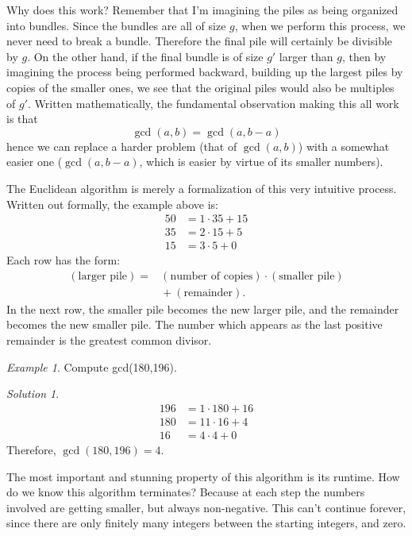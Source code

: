\documentclass{article}
\theoremstyle{plain}
\theoremstyle{definition}
\theoremstyle{remark}
\newtheorem{example}[theorem]{Example}
\newtheorem*{solution}{Solution}
\numberwithin{theorem}{section}
\begin{document}
Why does this work?  Remember that I'm imagining the piles as being organized into bundles.  Since the bundles are all of size $g$, when we perform this process, we never need to break a bundle.  Therefore the final pile will certainly be divisible by $g$.  On the other hand, if the final bundle is of size $g'$ larger than $g$, then by imagining the process being performed backward, building up the largest piles by copies of the smaller ones, we see that the original piles would also be multiples of $g'$.  Written mathematically, the fundamental observation making this all work is that
\[
	\gcd(a,b) = \gcd(a, b-a)
\]
hence we can replace a harder problem (that of $\gcd(a,b)$) with a somewhat easier one ($\gcd(a,b-a)$, which is easier by virtue of its smaller numbers).

The Euclidean algorithm is merely a formalization of this very intuitive process.  Written out formally, the example above is:
\begin{align*}
	50 &= 1 \cdot 35 + 15 \\
	35 &= 2 \cdot 15 + 5 \\
	15 &= 3 \cdot 5 + 0
\end{align*}
Each row has the form:
\begin{align*}
	(\text{larger pile}) = {}& (\text{number of copies}) \cdot (\text{smaller pile}) \\
	&{} + (\text{remainder}).
\end{align*}
In the next row, the smaller pile becomes the new larger pile, and the remainder becomes the new smaller pile.  The number which appears as the last positive remainder is the greatest common divisor.

\begin{example}
Compute gcd(180,196).

\begin{solution}
\begin{align*}
	196 &= 1 \cdot 180 + 16 \\
	180 &= 11 \cdot 16 + 4 \\
	16 &= 4 \cdot 4 + 0
\end{align*}
Therefore, $\gcd(180,196) = 4$.
\end{solution}
\end{example}

The most important and stunning property of this algorithm is its runtime.
How do we know this algorithm terminates?  Because at each step the numbers involved are getting smaller, but always non-negative.  This can't continue forever, since there are only finitely many integers between the starting integers, and zero. 
\end{document}
